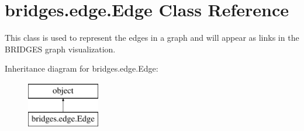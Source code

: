 \hypertarget{classbridges_1_1edge_1_1_edge}{}\section{bridges.\+edge.\+Edge Class Reference}
\label{classbridges_1_1edge_1_1_edge}


This class is used to represent the edges in a graph and will appear as links in the B\+R\+I\+D\+G\+E\+S graph visualization.  


Inheritance diagram for bridges.\+edge.\+Edge\+:\begin{figure}[H]
\begin{center}
\leavevmode
\includegraphics[height=2.000000cm]{classbridges_1_1edge_1_1_edge}
\end{center}
\end{figure}
